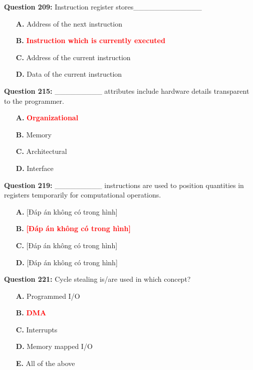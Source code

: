 \documentclass[12pt,a4paper]{article}
\begin{document}
\vspace{0.5cm}

\textbf{Question 209:} Instruction register stores_____________

\begin{itemize}
    \item[\textbf{A.}] Address of the next instruction
    \item[\textbf{B.}] \textcolor{red}{\textbf{Instruction which is currently executed}}
    \item[\textbf{C.}] Address of the current instruction
    \item[\textbf{D.}] Data of the current instruction
\end{itemize}

\vspace{0.5cm}

\textbf{Question 215:} _________ attributes include hardware details transparent to the programmer.

\begin{itemize}
    \item[\textbf{A.}] \textcolor{red}{\textbf{Organizational}}
    \item[\textbf{B.}] Memory
    \item[\textbf{C.}] Architectural
    \item[\textbf{D.}] Interface
\end{itemize}

\vspace{0.5cm}

\textbf{Question 219:} _________ instructions are used to position quantities in registers temporarily for computational operations.

\begin{itemize}
    \item[\textbf{A.}] [Đáp án không có trong hình]
    \item[\textbf{B.}] \textcolor{red}{\textbf{[Đáp án không có trong hình]}}
    \item[\textbf{C.}] [Đáp án không có trong hình]
    \item[\textbf{D.}] [Đáp án không có trong hình]
\end{itemize}

\vspace{0.5cm}

\textbf{Question 221:} Cycle stealing is/are used in which concept?

\begin{itemize}
    \item[\textbf{A.}] Programmed I/O
    \item[\textbf{B.}] \textcolor{red}{\textbf{DMA}}
    \item[\textbf{C.}] Interrupts
    \item[\textbf{D.}] Memory mapped I/O
    \item[\textbf{E.}] All of the above
\end{itemize}
\end{document}

